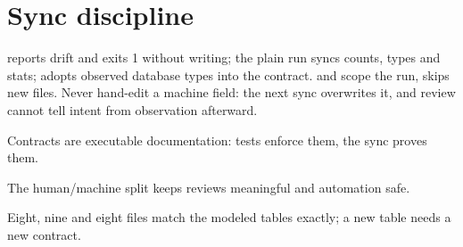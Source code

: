 \section{Sync discipline}

 reports drift and exits 1 without writing; the plain run syncs counts, types and stats;  adopts observed database types into the contract.  and  scope the run,  skips new files. Never hand-edit a machine field: the next sync overwrites it, and review cannot tell intent from observation afterward.

\begin{keybox}
\item Contracts are executable documentation: tests enforce them, the sync proves them.
\item The human/machine split keeps reviews meaningful and automation safe.
\item Eight, nine and eight files match the modeled tables exactly; a new table needs a new contract.
\end{keybox}
